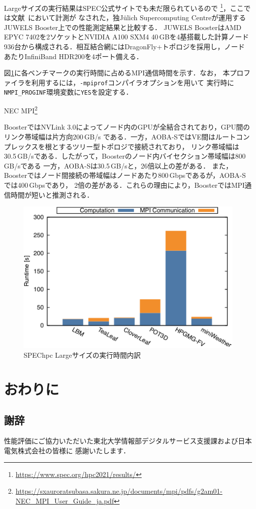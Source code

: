 ﻿\documentclass[submit,techrep,noauthor]{ipsj}
\begin{document}
Largeサイズの実行結果はSPEC公式サイトでも未だ限られているので
\footnote{\url{https://www.spec.org/hpc2021/results/}}，ここでは文献~\cite{Brunst2022}において計測が
なされた，独J\"{u}lich Supercomputing Centreが運用するJUWELS Booster上での性能測定結果と比較する．
JUWELS BoosterはAMD EPYC 7402を2ソケットとNVIDIA A100 SXM4
40\,GBを4基搭載した計算ノード936台から構成される．相互結合網にはDragonFly+トポロジを採用し，ノード
あたりInfiniBand HDR200を4ポート備える．

図\ref{fig:spechpc-profile}に各ベンチマークの実行時間に占めるMPI通信時間を示す．なお，
本プロファイラを利用するには，\verb|-mpiprof|コンパイラオプションを用いて
実行時に\verb|NMPI_PROGINF|環境変数に\verb|YES|を設定する．

NEC MPI\footnote{\url{https://sxauroratsubasa.sakura.ne.jp/documents/mpi/pdfs/g2am01-NEC_MPI_User_Guide_ja.pdf}}

BoosterではNVLink 3.0によってノード内のGPUが全結合されており，GPU間のリンク帯域幅は片方向200\,GB/s
である．一方，AOBA-SではVE間はルートコンプレックスを根とするツリー型トポロジで接続されており，
リンク帯域幅は30.5\,GB/sである．したがって，Boosterのノード内バイセクション帯域幅は800\,GB/sである
一方，AOBA-Sは30.5\,GB/sと，26倍以上の差がある．
また，Boosterではノード間接続の帯域幅はノードあたり800\,Gbpsであるが，AOBA-Sでは400\,Gbpsであり，
2倍の差がある．これらの理由により，BoosterではMPI通信時間が短いと推測される．

\begin{figure}
  \centering
  \includegraphics{figs/spechpc_profile.pdf}
  \caption{SPEChpc Largeサイズの実行時間内訳}\label{fig:spechpc-profile}
\end{figure}

\section{おわりに}

\subsection*{謝辞}

性能評価にご協力いただいた東北大学情報部デジタルサービス支援課および日本電気株式会社の皆様に
感謝いたします．



\end{document}
